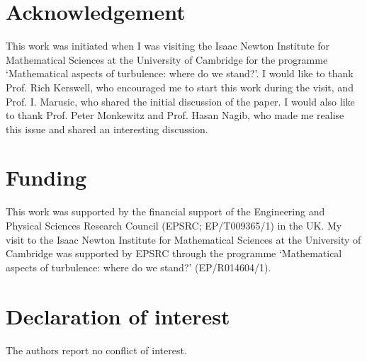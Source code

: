 \documentclass{jfm}
\begin{document}


\section*{Acknowledgement}
This work was initiated when I was visiting the Isaac Newton Institute for Mathematical Sciences at the University of Cambridge for the
programme `Mathematical aspects of turbulence: where do we stand?'. I would like to thank Prof. Rich Kerswell, who encouraged me to start this work during the visit, and Prof. I. Marusic, who shared the initial discussion of the paper. I would also like to thank Prof. Peter Monkewitz and Prof. Hasan Nagib, who made me realise this issue and shared an interesting discussion.

\section*{Funding}
This work was supported by the financial support of the Engineering and Physical Sciences Research Council (EPSRC; EP/T009365/1) in the UK. My visit to the Isaac Newton Institute for Mathematical Sciences at the University of Cambridge was supported by EPSRC through the programme `Mathematical aspects of turbulence: where do we stand?' (EP/R014604/1).

\section*{Declaration of interest}
The authors report no conflict of interest.



\end{document}
